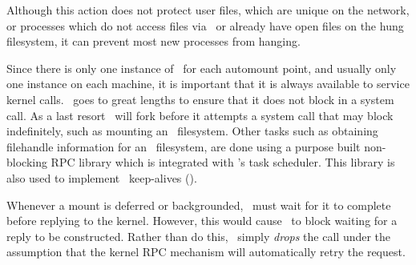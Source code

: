 
Although this action does not protect
user files, which are unique on the network, or processes which do not access files
via \amd\ or already have open files on the hung filesystem, it can prevent most new
processes from hanging.



Since there is only one instance of \amd\ for each automount point,
and usually only one instance on each machine, it is important
that it is always available to service kernel calls.
\Amd\ goes to great lengths to ensure that it does not block in a system call.
As a last resort \amd\ will fork before it attempts a system call that may block
indefinitely, such as mounting an \NFS\ filesystem.
Other tasks such as obtaining filehandle information for an \NFS\ filesystem,
are done using a purpose built non-blocking RPC library which is integrated
with \amd's task scheduler.%
This library is also used to implement \NFS\ keep-alives (\see {}).

Whenever a mount is deferred or backgrounded, \amd\ must wait for it to complete
before replying to the kernel.  However, this would cause \amd\ to block waiting
for a reply to be constructed.  Rather than do this, \amd\ simply {\em drops}
the call under the assumption that the kernel RPC mechanism will automatically
retry the request.
